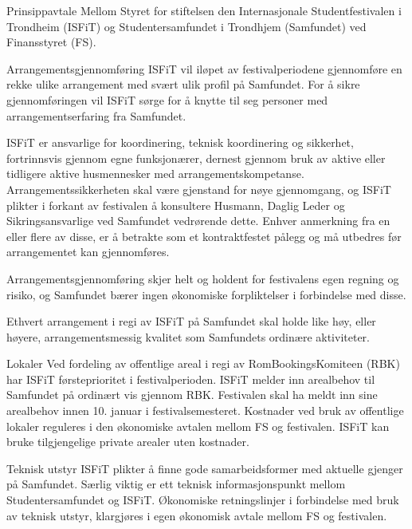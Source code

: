 \begin{instruks}{Prinsippavtale Mellom Styret for stiftelsen den Internasjonale Studentfestivalen i
        Trondheim (ISFiT) og Studentersamfundet i Trondhjem (Samfundet) ved Finansstyret
        (FS).}{}{}
    \begin{instruksledd}{Arrangementsgjennomføring}
        ISFiT vil iløpet av festivalperiodene gjennomføre en rekke ulike arrangement med
        svært ulik profil på Samfundet. For å sikre gjennomføringen vil ISFiT sørge for å knytte til seg
        personer med arrangementserfaring fra Samfundet. 

        ISFiT er ansvarlige for koordinering, teknisk koordinering og sikkerhet, fortrinnsvis gjennom egne
        funksjonærer, dernest gjennom bruk av aktive eller tidligere aktive husmennesker med
        arrangementskompetanse.
        Arrangementssikkerheten skal være gjenstand for nøye gjennomgang, og ISFiT plikter i forkant av
        festivalen å
        konsultere Husmann, Daglig Leder og Sikringsansvarlige ved Samfundet vedrørende dette. Enhver
        anmerkning fra en
        eller flere av disse, er å betrakte som et kontraktfestet pålegg og må utbedres før arrangementet
        kan gjennomføres.

        Arrangementsgjennomføring skjer helt og holdent for festivalens egen regning og risiko, og Samfundet
        bærer ingen
        økonomiske forpliktelser i forbindelse med disse.

        Ethvert arrangement i regi av ISFiT på Samfundet skal holde like høy, eller høyere,
        arrangementsmessig kvalitet som
        Samfundets ordinære aktiviteter.
    \end{instruksledd}

    \begin{instruksledd}{Lokaler}
        Ved fordeling av offentlige areal i regi av RomBookingsKomiteen (RBK) har ISFiT førsteprioritet i
        festivalperioden.
        ISFiT melder inn arealbehov til Samfundet på ordinært vis gjennom RBK. Festivalen skal ha meldt inn
        sine arealbehov innen 10. januar i festivalsemesteret. Kostnader ved bruk av offentlige lokaler
        reguleres i den økonomiske
        avtalen mellom FS og festivalen. ISFiT kan bruke tilgjengelige private arealer uten kostnader.
    \end{instruksledd}

    \begin{instruksledd}{Teknisk utstyr}
        ISFiT plikter å finne gode samarbeidsformer med aktuelle gjenger på Samfundet. Særlig viktig er ett
        teknisk
        informasjonspunkt mellom Studentersamfundet og ISFiT. Økonomiske retningslinjer i forbindelse med
        bruk av
        teknisk utstyr, klargjøres i egen økonomisk avtale mellom FS og festivalen.
    \end{instruksledd}


\end{instruks}
